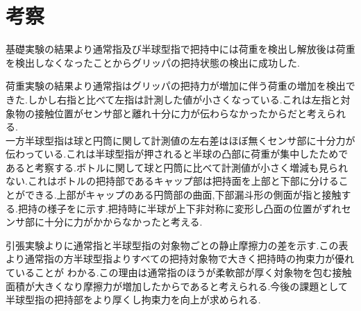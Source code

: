\section{考察}
基礎実験の結果より通常指及び半球型指で把持中には荷重を検出し解放後は荷重を検出しなくなったことからグリッパの把持状態の検出に成功した.\par
荷重実験の結果より通常指はグリッパの把持力が増加に伴う荷重の増加を検出できた.しかし右指と比べて左指は計測した値が小さくなっている.これは左指と対象物の接触位置がセンサ部と離れ十分に力が伝わらなかったからだと考えられる.\\
一方半球型指は球と円筒に関して計測値の左右差はほぼ無くセンサ部に十分力が伝わっている.これは半球型指が押されると半球の凸部に荷重が集中したためであると考察する.ボトルに関して球と円筒に比べて計測値が小さく増減も見られない.これはボトルの把持部であるキャップ部は把持面を上部と下部に分けることができる.上部がキャップのある円筒部の曲面,下部漏斗形の側面が指と接触する.把持の様子をに示す.把持時に半球が上下非対称に変形し凸面の位置がずれセンサ部に十分に力がかからなかったと考える.\par
引張実験よりに通常指と半球型指の対象物ごとの静止摩擦力の差を示す.この表より通常指の方半球型指よりすべての把持対象物で大きく把持時の拘束力が優れていることが
わかる.この理由は通常指のほうが柔軟部が厚く対象物を包む接触面積が大きくなり摩擦力が増加したからであると考えられる.今後の課題として半球型指の把持部をより厚くし拘束力を向上が求められる.

